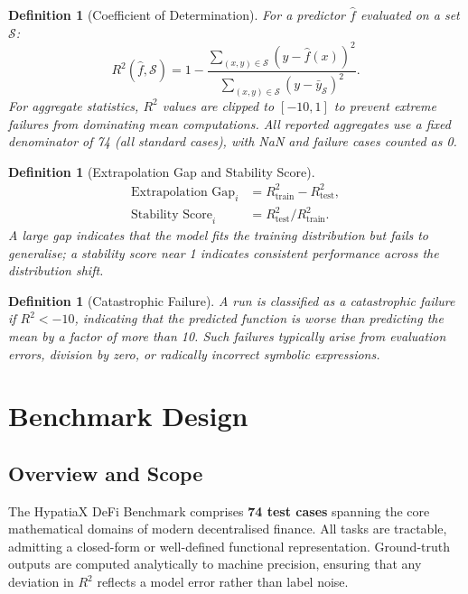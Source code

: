 \documentclass[twoside,11pt]{article}
\newcommand{\Rsq}{R^{2}}
\newcommand{\Rtrain}{R^{2}_{\mathrm{train}}}
\newcommand{\Rtest}{R^{2}_{\mathrm{test}}}
\newtheorem{definition}[theorem]{Definition}
\begin{document}
\begin{definition}[Coefficient of Determination]
For a predictor $\hat{f}$ evaluated on a set $\mathcal{S}$:
\begin{equation}
  \Rsq(\hat{f}, \mathcal{S}) = 1 - \frac{\sum_{(x,y)\in\mathcal{S}}(y - \hat{f}(x))^2}
                                         {\sum_{(x,y)\in\mathcal{S}}(y - \bar{y}_{\mathcal{S}})^2}.
  \label{eq:r2}
\end{equation}
For aggregate statistics, $\Rsq$ values are clipped to $[-10, 1]$ to prevent
extreme failures from dominating mean computations.  All reported aggregates use a
\emph{fixed denominator} of 74 (all standard cases), with NaN and failure cases
counted as 0.
\end{definition}

\begin{definition}[Extrapolation Gap and Stability Score]
\begin{align}
  \text{Extrapolation Gap}_i &= \Rtrain - \Rtest, \label{eq:gap}\\
  \text{Stability Score}_i   &= \Rtest / \Rtrain. \label{eq:stability}
\end{align}
A large gap indicates that the model fits the training distribution but fails
to generalise; a stability score near 1 indicates consistent performance across
the distribution shift.
\end{definition}

\begin{definition}[Catastrophic Failure]
A run is classified as a catastrophic failure if $\Rsq < -10$, indicating that
the predicted function is worse than predicting the mean by a factor of more
than 10.  Such failures typically arise from evaluation errors, division by
zero, or radically incorrect symbolic expressions.
\end{definition}

\section{Benchmark Design}
\label{sec:benchmark}

\subsection{Overview and Scope}
\label{sec:bench_overview}

The HypatiaX DeFi Benchmark comprises \textbf{74 test cases} spanning the core
mathematical domains of modern decentralised finance.  All tasks are tractable,
admitting a closed-form or well-defined functional representation.  Ground-truth
outputs are computed analytically to machine precision, ensuring that any
deviation in $\Rsq$ reflects a model error rather than label noise.
\end{document}
